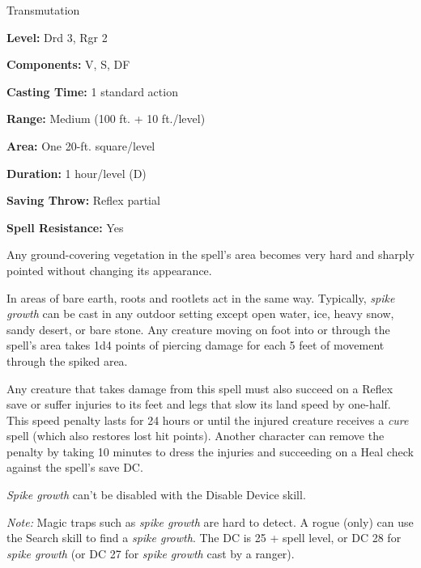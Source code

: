 
Transmutation

\textbf{Level:} Drd 3, Rgr 2

\textbf{Components:} V, S, DF

\textbf{Casting Time:} 1 standard action

\textbf{Range:} Medium (100 ft. + 10 ft./level)

\textbf{Area:} One 20-ft. square/level

\textbf{Duration:} 1 hour/level (D)

\textbf{Saving Throw:} Reflex partial

\textbf{Spell Resistance:} Yes

Any ground-covering vegetation in the spell's area becomes very hard and sharply 
pointed without changing its appearance.

In areas of bare earth, roots and rootlets act in the same way. Typically, \textit{spike 
growth} can be cast in any outdoor setting except open water, ice, heavy snow, 
sandy desert, or bare stone. Any creature moving on foot into or through the spell's 
area takes 1d4 points of piercing damage for each 5 feet of movement through the 
spiked area.

Any creature that takes damage from this spell must also succeed on a Reflex save 
or suffer injuries to its feet and legs that slow its land speed by one-half. This 
speed penalty lasts for 24 hours or until the injured creature receives a \textit{cure 
}spell (which also restores lost hit points). Another character can remove the 
penalty by taking 10 minutes to dress the injuries and succeeding on a Heal check 
against the spell's save DC.

\textit{Spike growth} can't be disabled with the Disable Device skill.

\textit{Note:} Magic traps such as \textit{spike growth} are hard to detect. A 
rogue (only) can use the Search skill to find a \textit{spike growth}. The DC is 
25 + spell level, or DC 28 for \textit{spike growth} (or DC 27 for \textit{spike 
growth} cast by a ranger).

